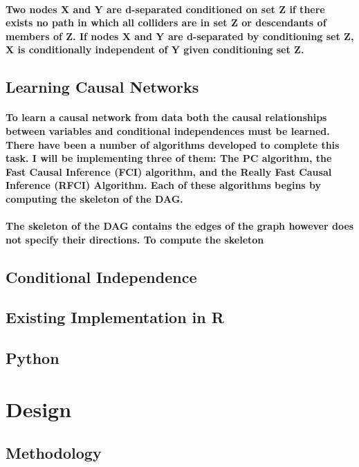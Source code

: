 \documentclass{article}
\begin{document}
\paragraph{Two nodes X and Y are d-separated conditioned on set Z if there exists no path in which all colliders are in set Z or descendants of members of Z. If nodes X and Y are d-separated by conditioning set Z, X is conditionally independent of Y given conditioning set Z.}

\subsection{Learning Causal Networks}
\paragraph{To learn a causal network from data both the causal relationships between variables and conditional independences must be learned. There have been a number of algorithms developed to complete this task. I will be implementing three of them: The PC algorithm, the Fast Causal Inference (FCI) algorithm, and the Really Fast Causal Inference (RFCI) Algorithm. Each of these algorithms begins by computing the skeleton of the DAG.}

\paragraph{The skeleton of the DAG contains the edges of the graph however does not specify their directions. To compute the skeleton }
\subsection{Conditional Independence}

\subsection{Existing Implementation in R}

\subsection{Python}


\section{Design}

\subsection{Methodology}
\end{document}
